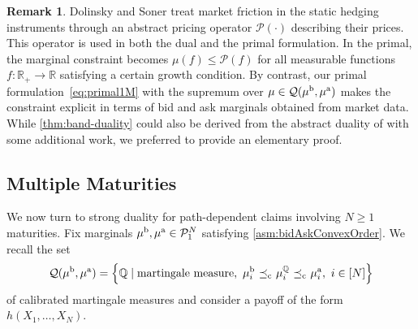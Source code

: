 \documentclass[11pt]{article}
\newcommand{\cP}{\mathcal{P}}
\newcommand{\cQ}{\mathcal{Q}}
\newcommand{\R}{\mathbb{R}} %
\newcommand{\Q}{\mathbb{Q}} %
\theoremstyle{plain}
\theoremstyle{definition}
\newtheorem{remark}[theorem]{Remark}
\theoremstyle{remark}
\DeclareMathOperator{\cleq}{\,\preceq_{\rm c}\,}
\theoremstyle{plain}
\begin{document}
\begin{remark}
    Dolinsky and Soner \cite{DolinskySoner2014} treat market friction in the static hedging instruments through an abstract pricing operator $\mathscr{P}(\cdot)$ describing their prices. This operator is used in both the dual and the primal formulation. In the primal, the marginal constraint becomes $\mu(f) \le \mathscr{P}(f)$ for all measurable functions $f:\R_+ \to \R$ satisfying a certain growth condition. By contrast, our primal formulation~\eqref{eq:primal1M} with the supremum over $\mu \in \cQ(\mu^{\rm b},\mu^{\rm a})$ makes the constraint explicit in terms of bid and ask marginals obtained from market data. While \cref{thm:band-duality} could also be derived from the abstract duality of \cite{DolinskySoner2014} with some additional work, we preferred to provide an elementary proof.
\end{remark}

%
%

\subsection{Multiple Maturities} 

We now turn to strong duality for path-dependent claims involving $N\geq1$ maturities. Fix marginals $\mu^{\rm b}, \mu^{\rm a}\in\cP_1^N$ satisfying \cref{asm:bidAskConvexOrder}. We recall the set
$$    \cQ(\mu^{\rm b}, \mu^{\rm a}) = \left\{\Q \mid \text{martingale measure}, \,\, \mu_i^{\rm b}\cleq \mu_i^{\Q}\cleq \mu_i^{\rm a},\,\, i \in [N]\right\}$$
 of calibrated martingale measures and consider a payoff of the form $h(X_1,\ldots, X_N)$.
\end{document}
